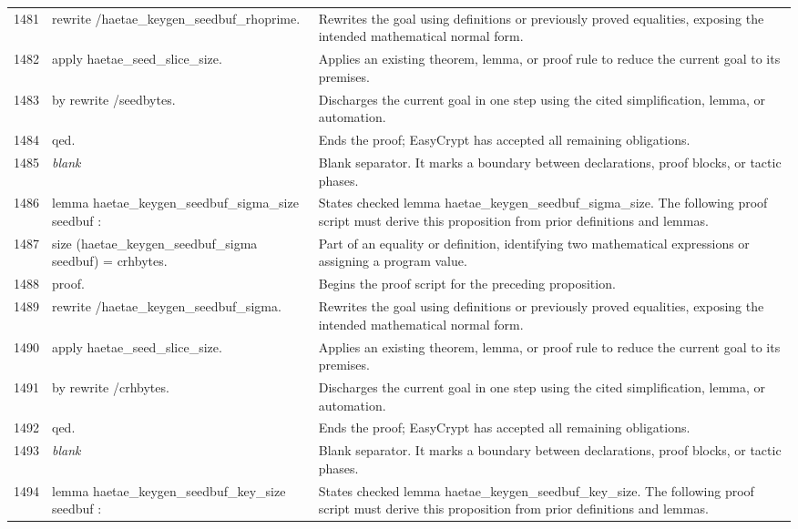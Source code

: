 \documentclass[10pt]{article}
\begin{document}
\begin{longtable}{r L{0.53\textwidth} L{0.37\textwidth}}
1481 & {\ttfamily\scriptsize rewrite /haetae\_keygen\_seedbuf\_rhoprime.} & Rewrites the goal using definitions or previously proved equalities, exposing the intended mathematical normal form. \\
1482 & {\ttfamily\scriptsize apply haetae\_seed\_slice\_size.} & Applies an existing theorem, lemma, or proof rule to reduce the current goal to its premises. \\
1483 & {\ttfamily\scriptsize by rewrite /seedbytes.} & Discharges the current goal in one step using the cited simplification, lemma, or automation. \\
1484 & {\ttfamily\scriptsize qed.} & Ends the proof; EasyCrypt has accepted all remaining obligations. \\
1485 & {\ttfamily\scriptsize \emph{blank}} & Blank separator.  It marks a boundary between declarations, proof blocks, or tactic phases. \\
1486 & {\ttfamily\scriptsize lemma haetae\_keygen\_seedbuf\_sigma\_size seedbuf :} & States checked lemma haetae\_keygen\_seedbuf\_sigma\_size.  The following proof script must derive this proposition from prior definitions and lemmas. \\
1487 & {\ttfamily\scriptsize   size (haetae\_keygen\_seedbuf\_sigma seedbuf) = crhbytes.} & Part of an equality or definition, identifying two mathematical expressions or assigning a program value. \\
1488 & {\ttfamily\scriptsize proof.} & Begins the proof script for the preceding proposition. \\
1489 & {\ttfamily\scriptsize rewrite /haetae\_keygen\_seedbuf\_sigma.} & Rewrites the goal using definitions or previously proved equalities, exposing the intended mathematical normal form. \\
1490 & {\ttfamily\scriptsize apply haetae\_seed\_slice\_size.} & Applies an existing theorem, lemma, or proof rule to reduce the current goal to its premises. \\
1491 & {\ttfamily\scriptsize by rewrite /crhbytes.} & Discharges the current goal in one step using the cited simplification, lemma, or automation. \\
1492 & {\ttfamily\scriptsize qed.} & Ends the proof; EasyCrypt has accepted all remaining obligations. \\
1493 & {\ttfamily\scriptsize \emph{blank}} & Blank separator.  It marks a boundary between declarations, proof blocks, or tactic phases. \\
1494 & {\ttfamily\scriptsize lemma haetae\_keygen\_seedbuf\_key\_size seedbuf :} & States checked lemma haetae\_keygen\_seedbuf\_key\_size.  The following proof script must derive this proposition from prior definitions and lemmas. \\

\end{longtable}
\end{document}
